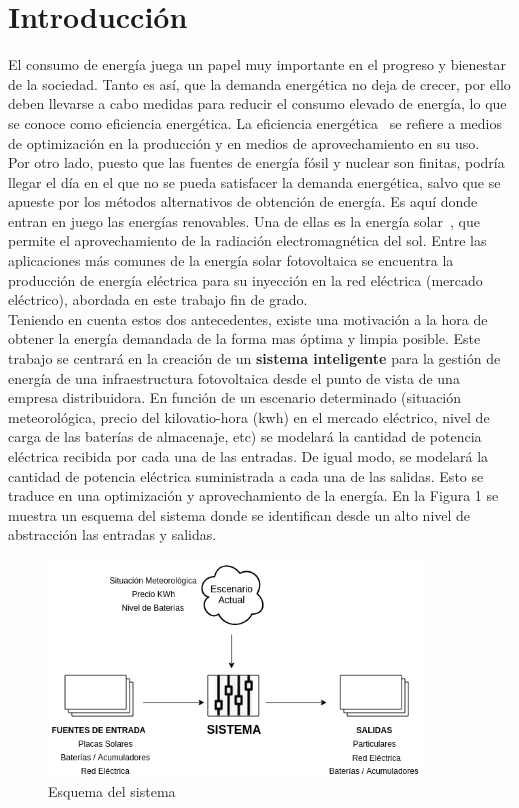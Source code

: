 \chapter{Introducción}
\label{cap:Introduccion}
El consumo de energía juega un papel muy importante en el progreso y bienestar de la sociedad. Tanto es así, que la demanda energética no deja de crecer, por ello deben llevarse a cabo medidas para reducir el consumo elevado de energía, lo que se conoce como eficiencia energética. La eficiencia energética~\cite{GarSa12} se refiere a medios de optimización en la producción y en medios de aprovechamiento en su uso. \\
Por otro lado, puesto que las fuentes de energía fósil y nuclear son finitas, podría llegar el día en el que no se pueda satisfacer la demanda energética, salvo que se apueste por los métodos alternativos de obtención de energía. Es aquí donde entran en juego las energías renovables. Una de ellas es la energía solar~\cite{Perp12}, que permite el aprovechamiento de la radiación electromagnética del sol. Entre las aplicaciones más comunes de la energía solar fotovoltaica se encuentra la producción de energía eléctrica para su inyección en la red eléctrica (mercado eléctrico), abordada en este trabajo fin de grado. \\


Teniendo en cuenta estos dos antecedentes, existe una motivación a la hora de obtener la energía demandada de la forma mas óptima y limpia posible. Este trabajo se centrará en la creación de un \textbf{sistema inteligente} para la gestión de energía de una infraestructura fotovoltaica desde el punto de vista de una empresa distribuidora. En función de un escenario determinado (situación meteorológica, precio del kilovatio-hora (kwh) en el mercado eléctrico, nivel de carga de las baterías de almacenaje, etc) se modelará la cantidad de potencia eléctrica recibida por cada una de las entradas. De igual modo, se modelará la cantidad de potencia eléctrica suministrada a cada una de las salidas. Esto se traduce en una optimización y aprovechamiento de la energía.
En la Figura 1 se muestra un esquema del sistema donde se identifican desde un alto nivel de abstracción las entradas y salidas.\\

\begin{figure}[!h]
	\centering
	\includegraphics[width=10cm]{figs/Abstract.png}
	\caption{Esquema del sistema}
\end{figure}

